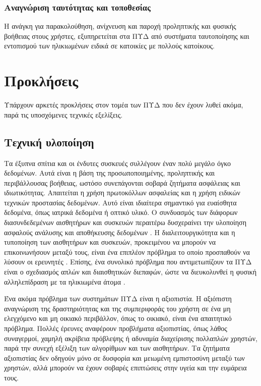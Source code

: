 \subsubsection{Αναγνώριση ταυτότητας και τοποθεσίας}
Η ανάγκη για παρακολούθηση, ανίχνευση και παροχή προληπτικής και φυσικής βοήθειας στους χρήστες, εξυπηρετείται στα ΠΥΔ από συστήματα ταυτοποίησης και εντοπισμού των ηλικιωμένων ειδικά σε κατοικίες με πολλούς κατοίκους.

\section{Προκλήσεις}
Υπάρχουν αρκετές προκλήσεις στον τομέα των ΠΥΔ που δεν έχουν λυθεί ακόμα, παρά τις υποσχόμενες τεχνικές εξελίξεις.
\subsection{Τεχνική υλοποίηση}
Τα έξυπνα σπίτια και οι ένδυτες συσκευές συλλέγουν έναν πολύ μεγάλο όγκο δεδομένων.
Αυτά είναι η βάση της προσωποποιημένης, προληπτικής και περιβάλλουσας βοήθειας, ωστόσο συνεπάγονται σοβαρά ζητήματα ασφάλειας και ιδιωτικότητας.
Απαιτείται η χρήση πρωτοκόλλων ασφαλείας και η χρήση ειδικών τεχνικών προστασίας δεδομένων.
Αυτό είναι ιδιαίτερα σημαντικό για ευαίσθητα δεδομένα, όπως ιατρικά δεδομένα ή οπτικό υλικό.
Ο συνδυασμός των διάφορων διασυνδεδεμένων αισθητήρων και συσκευών περαιτέρω δυσχεραίνει την υλοποίηση ασφαλούς ανάλυσης και αποθήκευσης δεδομένων \cite{Acampora2013}\cite{Ghayvat2015}\cite{rashidi2012survey}.
Η διαλειτουργικότητα και η τυποποίηση των αισθητήρων και συσκευών, προκειμένου να μπορούν να επικοινωνήσουν μεταξύ τους, είναι ένα επιπλέον πρόβλημα το οποίο προσπαθούν να λύσουν οι ερευνητές \cite{Memon2014}\cite{Queiros2013}.
Επίσης, ένα συνολικό πρόβλημα που αντιμετωπίζουν τα ΠΥΔ είναι ο σχεδιασμός απλών και διαισθητικών διεπαφών, ώστε να διευκολυνθεί η φυσική αλληλεπίδραση με τα ηλικιωμένα άτομα \cite{Queiros2013}\cite{Sun2009}.
\par
Ένα ακόμα πρόβλημα των συστημάτων ΠΥΔ είναι η αξιοπιστία.
Η αξιόπιστη αναγνώριση της δραστηριότητας και της συμπεριφοράς του χρήστη σε ένα μη ελεγχόμενο και μη οικιακό περιβάλλον, όπως το οικιακό, είναι ένα απαιτητικό πρόβλημα.
Πολλές έρευνες αναφέρουν προβλήματα αξιοπιστίας, όπως λάθος συναγερμοί, χαμηλή ακρίβεια πρόβλεψης ή αδυναμία διαχείρισης πολλαπλών χρηστών, παρά την συνεχή εξέλιξη των αλγορίθμων και των αισθητήρων.
Τα ζητήματα αξιοπιστίας δεν οδηγούν μόνο σε δυσφορία και μειωμένη εμπιστοσύνη μεταξύ των χρηστών, αλλά μπορούν να έχουν σοβαρές επιπτώσεις στην υγεία και την ευμάρεια τους.
